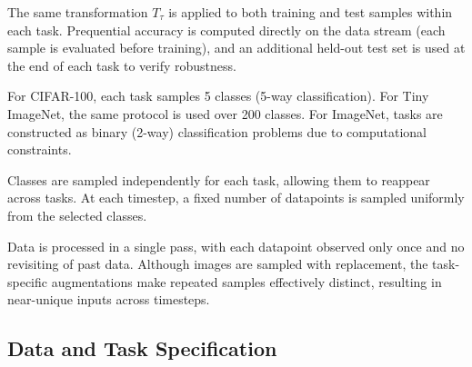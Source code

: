 \documentclass{article}
\begin{document}
The same transformation $T_\tau$ is applied to both training and test samples within each task. Prequential accuracy is computed directly on the data stream (each sample is evaluated before training), and an additional held-out test set is used at the end of each task to verify robustness.

For CIFAR-100, each task samples 5 classes (5-way classification). For Tiny ImageNet, the same protocol is used over 200 classes. For ImageNet, tasks are constructed as binary (2-way) classification problems due to computational constraints.

Classes are sampled independently for each task, allowing them to reappear across tasks. At each timestep, a fixed number of datapoints is sampled uniformly from the selected classes.

Data is processed in a single pass, with each datapoint observed only once and no revisiting of past data. Although images are sampled with replacement, the task-specific augmentations make repeated samples effectively distinct, resulting in near-unique inputs across timesteps.

\subsection{Data and Task Specification}
\end{document}
